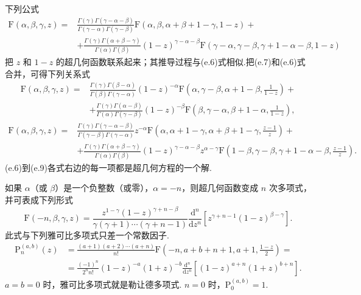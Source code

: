 下列公式
\begin{equation}
\begin{aligned}
  \mathrm{F}(\alpha,\beta,\gamma,z)={}&\frac{\Gamma(\gamma)\Gamma(\gamma-\alpha-\beta)}
  {\Gamma(\gamma-\alpha)\Gamma(\gamma-\beta)}
  \mathrm{F}(\alpha,\beta,\alpha+\beta+1-\gamma,1-z)+\\
  &+\frac{\Gamma(\gamma)\Gamma(\alpha+\beta-\gamma)}
  {\Gamma(\alpha)\Gamma(\beta)}(1-z)^{\gamma-\alpha-\beta}
  \mathrm{F}(\gamma-\alpha,\gamma-\beta,\gamma+1-\alpha-\beta,1-z)
\end{aligned}
\end{equation}
把 $z$ 和 $1-z$ 的超几何函数联系起来；其推导过程与(e.6)式相似.把(e.7)和(e.6)式合并，可得下列关系式
\begin{equation}
\begin{aligned}
  \mathrm{F}(\alpha,\beta,\gamma,z)={}&\frac{\Gamma(\gamma)\Gamma(\beta-\alpha)}
  {\Gamma(\beta)\Gamma(\gamma-\alpha)}(1-z)^{-\alpha}
  \mathrm{F}\left(\alpha,\gamma-\beta,\alpha+1-\beta,\frac{1}{1-z}\right)+\\
  &+\frac{\Gamma(\gamma)\Gamma(\alpha-\beta)}
  {\Gamma(\alpha)\Gamma(\gamma-\beta)}(1-z)^{-\beta}
  \mathrm{F}\left(\beta,\gamma-\alpha,\beta+1-\alpha,\frac{1}{1-z}\right),
\end{aligned}
\end{equation}
\begin{equation}
\begin{aligned}
  \mathrm{F}(\alpha,\beta,\gamma,z)={}&\frac{\Gamma(\gamma)\Gamma(\gamma-\alpha-\beta)}
  {\Gamma(\gamma-\beta)\Gamma(\gamma-\alpha)}z^{-\alpha}
  \mathrm{F}\left(\alpha,\alpha+1-\gamma,\alpha+\beta+1-\gamma,\frac{z-1}{z}\right)+\\
  &+\frac{\Gamma(\gamma)\Gamma(\alpha+\beta-\gamma)}
  {\Gamma(\alpha)\Gamma(\beta)}(1-z)^{\gamma-\alpha-\beta}z^{\alpha-\gamma}
  \mathrm{F}\left(1-\beta,\gamma-\beta,\gamma+1-\alpha-\beta,\frac{z-1}{z}\right).
\end{aligned}
\end{equation}
(e.6)到(e.9)各式右边的每一项都是超几何方程的一个解.

如果 $\alpha$（或 $\beta$）是一个负整数（或零），$\alpha=-n$，则超几何函数变成 $n$ 次多项式，并可表成下列形式
\begin{equation}
  \mathrm{F}(-n,\beta,\gamma,z)=\frac{z^{1-\gamma}(1-z)^{\gamma+n-\beta}}
  {\gamma(\gamma+1)\cdots(\gamma+n-1)}
  \frac{\mathrm{d}^n}{\mathrm{d}z^n}
  \left[z^{\gamma+n-1}(1-z)^{\beta-\gamma}\right].
\end{equation}
此式与下列雅可比多项式只差一个常数因子.
\begin{equation}
\begin{aligned}
  \mathrm{P}_n^{(a,b)}(z)&=\frac{(a+1)(a+2)\cdots(a+n)}{n!}
  \mathrm{F}\left(-n,a+b+n+1,a+1,\frac{1-z}{2}\right)=\\
  &=\frac{(-1)^n}{2^n n!}(1-z)^{-a}(1+z)^{-b}\frac{\mathrm{d}^n}{\mathrm{d}z^n}
  \left[(1-z)^{a+n}(1+z)^{b+n}\right].
\end{aligned}
\end{equation}
$a=b=0$ 时，雅可比多项式就是勒让德多项式. $n=0$ 时，$\mathrm{P}_0^{(a,b)}=1$.

